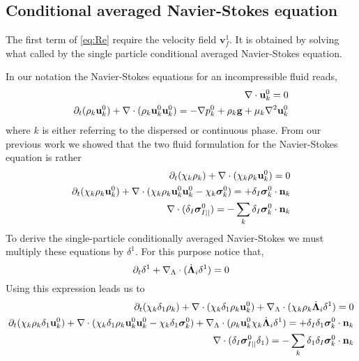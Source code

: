 \subsection{Conditional averaged Navier-Stokes equation}

The first term of \ref{eq:Re} require the velocity field $\textbf{v}_f^1$. 
It is obtained by solving what called by \citet{hinch1977averaged} the single particle conditional averaged Navier-Stokes equation. 

In our notation the Navier-Stokes equations for an incompressible fluid reads, 
\begin{align}
    \mathbf{\nabla}\cdot \textbf{u}_k^0  = 0 \\
    \partial_t (\rho_k \textbf{u}_k^0 )
    + \mathbf{\nabla}\cdot(\rho_k \textbf{u}_k^0  \textbf{u}_k^0 ) 
    = - \mathbf{\nabla} p_k^0 
    + \rho_k \textbf{g}
    + \mu_k \mathbf{\nabla}^2 \textbf{u}_k^0
\end{align}
where $k$ is either referring to the dispersed or continuous phase. 
From our previous work we showed that the two fluid formulation for the Navier-Stokes equation is rather 
\begin{align}
    \partial_t (\chi_k \rho_k )
    + \mathbf{\nabla}\cdot (
        \chi_k \rho_k  \textbf{u}_k^0
        )
        = 
        0 \\
        \partial_t (\chi_k \rho_k \textbf{u}_k^0)
        + \mathbf{\nabla}\cdot (
        \chi_k \rho_k \textbf{u}_k^0 \textbf{u}_k^0
        - \chi_k \bm\sigma_k^0 
        )
    = 
    + \delta_I
         \bm\sigma_k^0
    \cdot \textbf{n}_k\\
        \mathbf{\nabla}\cdot (\delta_I \bm\sigma_{I||}^0 )
        = 
        - \sum_k
        \delta_I
        \bm\sigma_k^0
   \cdot \textbf{n}_k
\end{align}
To derive the single-particle conditionally averaged Navier-Stokes we must multiply these equations by $\delta^1$. 
For this purpose notice that, 
\begin{equation}
    \partial_t \delta^1+\mathbf{\nabla}_\Lambda\cdot(\dot{\bm\Lambda}_i \delta^1 ) = 0 
\end{equation} 
Using this expression leads us to 
\begin{align}
    \partial_t (\chi_k \delta_1 \rho_k )
    + \mathbf{\nabla}\cdot (
        \chi_k  \delta_1 \rho_k  \textbf{u}_k^0
        )
    +  \mathbf{\nabla}_\Lambda \cdot (\chi_k \rho_k \dot{\bm\Lambda}_i \delta^1)
    = 
    0 \\
    \partial_t (\chi_k \rho_k \delta_1 \textbf{u}_k^0)
    + \mathbf{\nabla}\cdot (
        \chi_k\delta_1 \rho_k \textbf{u}_k^0 \textbf{u}_k^0
        - \chi_k\delta_1 \bm\sigma_k^0 
        )
    +  \mathbf{\nabla}_\Lambda \cdot ( \rho_k \textbf{u}_k^0 \chi_k \dot{\bm\Lambda}_i \delta^1)
    = 
    + \delta_I\delta_1
         \bm\sigma_k^0
    \cdot \textbf{n}_k\\
        \mathbf{\nabla}\cdot (\delta_I \bm\sigma_{I||}^0 \delta_1 )
        = 
        - \sum_k\delta_1
        \delta_I
        \bm\sigma_k^0
   \cdot \textbf{n}_k
\end{align}

